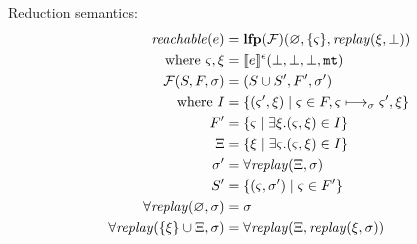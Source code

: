 \documentclass{llncs}
\newcommand{\finto}{\mathbin{\overset{\text{fin}}{\rightharpoonup}}}
\newcommand{\setof}[1]{\{ #1 \}}
\begin{document}
Reduction semantics:
\begin{align*}
\reachable{e} &= \lfp{{\mathcal F}}(\varnothing, \setof{\mstate}, \replay(\msdiff,\bot)) \\
 \text{ where } \mstate, \msdiff &= \compile{e}^{\mtcntr}(\bot,\bot,\bot,\kmt) \\
{\mathcal F}(S,F,\msto) &= (S \cup S', F', \msto') \\
 \text{ where } I &=
   \setof{ \ttuple{\mstate'}{\msdiff} \mid \mstate \in F, \mstate \machstep_\msto \mstate', \msdiff} \\
   F' &= \setof{\mstate \mid \exists \msdiff. \ttuple{\mstate}{\msdiff} \in I} \\
   \Xi &= \setof{\msdiff \mid \exists \mstate. \ttuple{\mstate}{\msdiff} \in I} \\
   \msto' &= \replayall(\Xi,\msto) \\
   S' &= \setof{\ttuple{\mstate}{\msto'} \mid \mstate \in F'} \\
   \replayall(\varnothing,\msto) &= \msto \\
   \replayall(\setof{\msdiff} \cup \Xi, \msto) &= \replayall(\Xi, \replay(\msdiff, \msto))
\end{align*}


\end{document}
